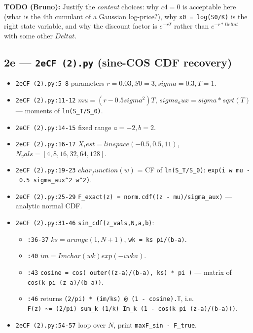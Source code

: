 \documentclass[
  11pt,
]{article}
\providecommand{\tightlist}{%
  \setlength{\itemsep}{0pt}\setlength{\parskip}{0pt}}
\begin{document}
\textbf{TODO (Bruno):} Justify the \emph{content} choices: why
\(c4 = 0\) is acceptable here (what is the 4th cumulant of a Gaussian
log-price?), why \texttt{x0\ =\ log(S0/K)} is the right state variable,
and why the discount factor is \(e^{-rT}\) rather than
\(e^{-r*Delta t}\) with some other \(Delta t\).

\hypertarget{e-2ecf-2.py-sine-cos-cdf-recovery}{%
\subsection{\texorpdfstring{2e --- \texttt{2eCF\ (2).py} (sine-COS CDF
recovery)}{2e --- 2eCF (2).py (sine-COS CDF recovery)}}\label{e-2ecf-2.py-sine-cos-cdf-recovery}}

\begin{itemize}
\tightlist
\item
  \texttt{2eCF\ (2).py:5-8} parameters \(r=0.03, S0=3, sigma=0.3, T=1\).
\item
  \texttt{2eCF\ (2).py:11-12} \(mu = (r - 0.5 sigma^2) T\),
  \(sigma_aux = sigma*sqrt(T)\) --- moments of \texttt{ln(S\_T/S\_0)}.
\item
  \texttt{2eCF\ (2).py:14-15} fixed range \(a=-2, b=2\).
\item
  \texttt{2eCF\ (2).py:16-17} \(X_test = linspace(-0.5, 0.5, 11)\),
  \(N_vals = [4,8,16,32,64,128]\).
\item
  \texttt{2eCF\ (2).py:19-23} \(char_function(w)\) = CF of
  \texttt{ln(S\_T/S\_0)}:
  \texttt{exp(i\ w\ mu\ -\ 0.5\ sigma\_aux\^{}2\ w\^{}2)}.
\item
  \texttt{2eCF\ (2).py:25-29}
  \texttt{F\_exact(z)\ =\ norm.cdf((z\ -\ mu)/sigma\_aux)} --- analytic
  normal CDF.
\item
  \texttt{2eCF\ (2).py:31-46} \texttt{sin\_cdf(z\_vals,N,a,b)}:

  \begin{itemize}
  \tightlist
  \item
    \texttt{:36-37} \(ks = arange(1,N+1)\),
    \texttt{wk\ =\ ks\ pi/(b-a)}.
  \item
    \texttt{:40} \(im = Im{ char(wk) exp(-i wk a) }\).
  \item
    \texttt{:43}
    \texttt{cosine\ =\ cos(\ outer((z-a)/(b-a),\ ks)\ *\ pi\ )} ---
    matrix of \texttt{cos(k\ pi\ (z-a)/(b-a))}.
  \item
    \texttt{:46} returns
    \texttt{(2/pi)\ *\ (im/ks)\ @\ (1\ -\ cosine).T}, i.e.
    \texttt{F(z)\ \textasciitilde{}=\ (2/pi)\ sum\_k\ (1/k)\ Im\_k\ (1\ -\ cos(k\ pi\ (z-a)/(b-a)))}.
  \end{itemize}
\item
  \texttt{2eCF\ (2).py:54-57} loop over \(N\), print
  \texttt{max\textbar{}F\_sin\ -\ F\_true\textbar{}}.
\end{itemize}
\end{document}
